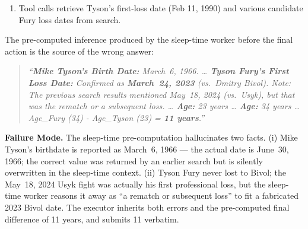 \begin{tcolorbox}[colback=orange!5, colframe=orange!70!black, title=\textsc{Sleep-Time Compute} (Pred: 11 / GT: 12), fontupper=\small, breakable]
\begin{enumerate}
  \item[1-8.] Tool calls retrieve Tyson's first-loss date (Feb 11, 1990) and various candidate Fury loss dates from search.
\end{enumerate}
The pre-computed inference produced by the sleep-time worker before the final action is the source of the wrong answer:
\begin{quote}\small
\textit{``\textbf{Mike Tyson's Birth Date:} March~6, 1966. \dots{} \textbf{Tyson Fury's First Loss Date:} Confirmed as \textbf{March~24, 2023} (vs.\ Dmitry Bivol). Note: The previous search results mentioned May~18, 2024 (vs.\ Usyk), but that was the rematch or a subsequent loss. \dots{} \textbf{Age:} 23 years \dots{} \textbf{Age:} 34 years \dots{} Age\_Fury (34) - Age\_Tyson (23) = \textbf{11 years}.''}
\end{quote}
\textbf{Failure Mode.} The sleep-time pre-computation hallucinates two facts. (i) Mike Tyson's birthdate is reported as March~6, 1966 --- the actual date is June~30, 1966; the correct value was returned by an earlier search but is silently overwritten in the sleep-time context. (ii) Tyson Fury never lost to Bivol; the May~18, 2024 Usyk fight was actually his first professional loss, but the sleep-time worker reasons it away as ``a rematch or subsequent loss'' to fit a fabricated 2023 Bivol date. The executor inherits both errors and the pre-computed final difference of 11 years, and submits 11 verbatim.
\end{tcolorbox}

